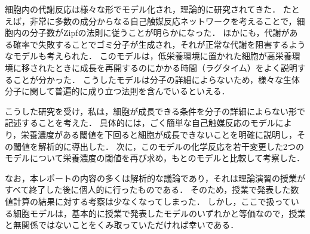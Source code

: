 細胞内の代謝反応は様々な形でモデル化され，理論的に研究されてきた．
たとえば，非常に多数の成分からなる自己触媒反応ネットワークを考えることで，細胞内の分子数がZipfの法則に従うことが明らかになった\cite{hurusawa}．
ほかにも，代謝がある確率で失敗することでゴミ分子が生成され，それが正常な代謝を阻害するようなモデルも考えられた\cite{hk17}．
このモデルは，低栄養環境に置かれた細胞が高栄養環境に移されたときに成長を再開するのにかかる時間（ラグタイム）をよく説明することが分かった．
こうしたモデルは分子の詳細によらないため，様々な生体分子に関して普遍的に成り立つ法則を含んでいるといえる．

こうした研究を受け，私は，細胞が成長できる条件を分子の詳細によらない形で記述することを考えた．
具体的には，ごく簡単な自己触媒反応のモデルにより，栄養濃度がある閾値を下回ると細胞が成長できないことを明確に説明し，その閾値を解析的に導出した．
次に，このモデルの化学反応を若干変更した2つのモデルについて栄養濃度の閾値を再び求め，もとのモデルと比較して考察した．

なお，本レポートの内容の多くは解析的な議論であり，それは理論演習の授業がすべて終了した後に個人的に行ったものである．
そのため，授業で発表した数値計算の結果に対する考察は少なくなってしまった．
しかし，ここで扱っている細胞モデルは，基本的に授業で発表したモデルのいずれかと等価なので，授業と無関係ではないことをくみ取っていただければ幸いである．
